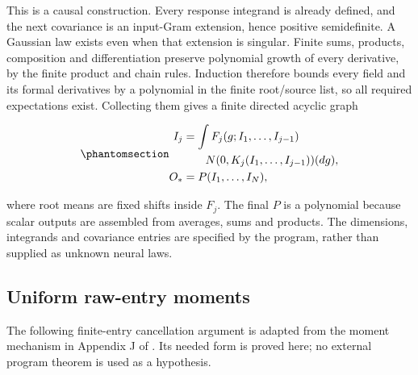 \documentclass[
  11pt,
]{article}
\theoremstyle{definition}
\theoremstyle{plain}
\theoremstyle{plain}
\theoremstyle{plain}
\theoremstyle{remark}
\begin{document}
This is a causal construction. Every response integrand is already
defined, and the next covariance is an input-Gram extension, hence
positive semidefinite. A Gaussian law exists even when that extension is
singular. Finite sums, products, composition and differentiation
preserve polynomial growth of every derivative, by the finite product
and chain rules. Induction therefore bounds every field and its formal
derivatives by a polynomial in the finite root/source list, so all
required expectations exist. Collecting them gives a finite directed
acyclic graph

\begin{equation}\protect\phantomsection\label{eq-mfp-expectation-graph}{
\begin{aligned}
I_j&=\int F_j(g;I_1,\ldots,I_{j-1})\\
&\qquad N(0,K_j(I_1,\ldots,I_{j-1}))(dg),\\
O_*&=P(I_1,\ldots,I_N),
\end{aligned}
}\end{equation}

where root means are fixed shifts inside \(F_j\). The final \(P\) is a
polynomial because scalar outputs are assembled from averages, sums and
products. The dimensions, integrands and covariance entries are
specified by the program, rather than supplied as unknown neural laws.

\subsection{Uniform raw-entry moments}\label{sec-mfp-uniform-moments}

The following finite-entry cancellation argument is adapted from the
moment mechanism in Appendix J of \citet{golikov2022nongaussian}. Its
needed form is proved here; no external program theorem is used as a
hypothesis.
\end{document}
